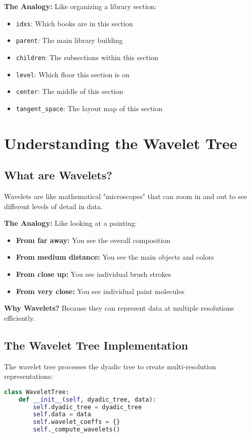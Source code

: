 \documentclass[12pt]{article}
\begin{document}
\textbf{The Analogy:} Like organizing a library section:
\begin{itemize}
    \item \texttt{idxs}: Which books are in this section
    \item \texttt{parent}: The main library building
    \item \texttt{children}: The subsections within this section
    \item \texttt{level}: Which floor this section is on
    \item \texttt{center}: The middle of this section
    \item \texttt{tangent\_space}: The layout map of this section
\end{itemize}

\section{Understanding the Wavelet Tree}

\subsection{What are Wavelets?}

Wavelets are like mathematical "microscopes" that can zoom in and out to see different levels of detail in data.

\textbf{The Analogy:} Like looking at a painting:
\begin{itemize}
    \item \textbf{From far away:} You see the overall composition
    \item \textbf{From medium distance:} You see the main objects and colors
    \item \textbf{From close up:} You see individual brush strokes
    \item \textbf{From very close:} You see individual paint molecules
\end{itemize}

\textbf{Why Wavelets?} Because they can represent data at multiple resolutions efficiently.

\subsection{The Wavelet Tree Implementation}

The wavelet tree processes the dyadic tree to create multi-resolution representations:

\begin{lstlisting}[language=Python, basicstyle=\small]
class WaveletTree:
    def __init__(self, dyadic_tree, data):
        self.dyadic_tree = dyadic_tree
        self.data = data
        self.wavelet_coeffs = {}
        self._compute_wavelets()
\end{lstlisting}
\end{document}
